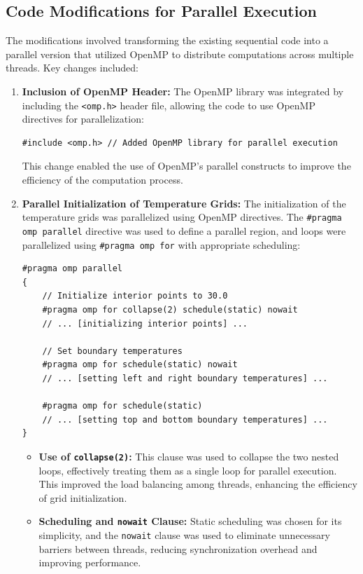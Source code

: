 \documentclass{article}
\begin{document}
\subsection{Code Modifications for Parallel Execution}

The modifications involved transforming the existing sequential code into a parallel version that utilized OpenMP to distribute computations across multiple threads. Key changes included:

\begin{enumerate}
    \item \textbf{Inclusion of OpenMP Header:} The OpenMP library was integrated by including the \texttt{<omp.h>} header file, allowing the code to use OpenMP directives for parallelization:

\begin{lstlisting}[style=CStyle, caption={Added OpenMP library for parallel execution}]
#include <omp.h> // Added OpenMP library for parallel execution
\end{lstlisting}

    This change enabled the use of OpenMP's parallel constructs to improve the efficiency of the computation process.

    \item \textbf{Parallel Initialization of Temperature Grids:} The initialization of the temperature grids was parallelized using OpenMP directives. The \texttt{\#pragma omp parallel} directive was used to define a parallel region, and loops were parallelized using \texttt{\#pragma omp for} with appropriate scheduling:

\begin{lstlisting}[style=CStyle, caption={Parallel Initialization}]
#pragma omp parallel
{
    // Initialize interior points to 30.0
    #pragma omp for collapse(2) schedule(static) nowait
    // ... [initializing interior points] ...

    // Set boundary temperatures
    #pragma omp for schedule(static) nowait
    // ... [setting left and right boundary temperatures] ...

    #pragma omp for schedule(static)
    // ... [setting top and bottom boundary temperatures] ...
}
\end{lstlisting}

    \begin{itemize}
        \item \textbf{Use of \texttt{collapse(2)}:} This clause was used to collapse the two nested loops, effectively treating them as a single loop for parallel execution. This improved the load balancing among threads, enhancing the efficiency of grid initialization.
        \item \textbf{Scheduling and \texttt{nowait} Clause:} Static scheduling was chosen for its simplicity, and the \texttt{nowait} clause was used to eliminate unnecessary barriers between threads, reducing synchronization overhead and improving performance.
    \end{itemize}


\end{enumerate}
\end{document}
